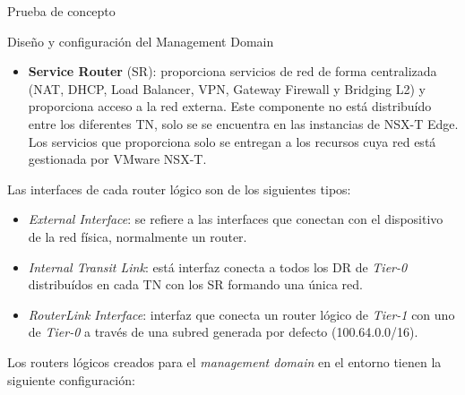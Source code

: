 \begin{section}{Prueba de concepto}
\begin{subsection}{Diseño y configuración del Management Domain}
\begin{itemize}
      \item \textbf{Service Router} (SR): proporciona servicios de red de forma centralizada (NAT, DHCP, Load Balancer, VPN, Gateway Firewall y Bridging L2) y proporciona acceso a la red externa. Este componente no está distribuído entre los diferentes TN, solo se se encuentra en las instancias de NSX-T Edge. Los servicios que proporciona solo se entregan a los recursos cuya red está gestionada por VMware NSX-T.
    \end{itemize}
    
    Las interfaces de cada router lógico son de los siguientes tipos:
    
    \begin{itemize}
      \item \textit{External Interface}: se refiere a las interfaces que conectan con el dispositivo de la red física, normalmente un router.
      \item \textit{Internal Transit Link}: está interfaz conecta a todos los DR de \textit{Tier-0} distribuídos en cada TN con los SR formando una única red.
      \item \textit{RouterLink Interface}: interfaz que conecta un router lógico de \textit{Tier-1} con uno de \textit{Tier-0} a través de una subred generada por defecto (100.64.0.0/16).
    \end{itemize}
    
    Los routers lógicos creados para el \textit{management domain} en el entorno tienen la siguiente configuración:
    

\end{subsection}
\end{section}
